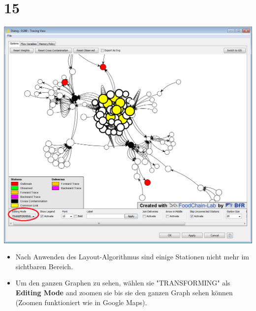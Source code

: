 \documentclass{beamer}
\begin{document}
\section{15}
\begin{frame}
	\begin{center}
  		\includegraphics[height=0.6\textheight]{15.png}
	\end{center}
	\begin{itemize}
		\item Nach Anwenden des Layout-Algorithmus sind einige Stationen nicht mehr im sichtbaren Bereich.
		\item Um den ganzen Graphen zu sehen, wählen sie "TRANSFORMING" als \textbf{Editing Mode} and zoomen sie bis sie den ganzen Graph sehen können (Zoomen funktioniert wie in Google Maps).
	\end{itemize}
\end{frame}
\end{document}
